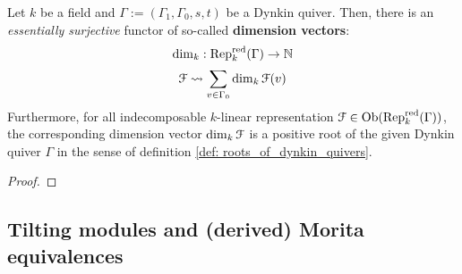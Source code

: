            \begin{corollary} \label{coro: dimension_vectors_of_indecomposable_representations_of_dynkin_quivers}
                Let $k$ be a field and $\Gamma := (\Gamma_1, \Gamma_0, s, t)$ be a Dynkin quiver. Then, there is an \textit{essentially surjective} functor of so-called \textbf{dimension vectors}:
                    $$\dim_k: \mathrm{Rep}_k^{\mathrm{red}}(\Gamma) \to \mathbb{N}$$
                    $$\mathcal{F} \leadsto \sum_{v \in \Gamma_0} \dim_k \mathcal{F}(v)$$
                Furthermore, for all indecomposable $k$-linear representation $\mathcal{F} \in \mathrm{Ob}(\mathrm{Rep}_k^{\mathrm{red}}(\Gamma))$, the corresponding dimension vector $\dim_k \mathcal{F}$ is a positive root of the given Dynkin quiver $\Gamma$ in the sense of definition \ref{def: roots_of_dynkin_quivers}.
            \end{corollary}
                \begin{proof}
                    
                \end{proof}
                
            \begin{example}
                
            \end{example}
            \begin{example}
                
            \end{example}
            \begin{example}
                
            \end{example}
            \begin{example}
                
            \end{example}
            \begin{example}
                
            \end{example}
        
    \subsection{Tilting modules and (derived) Morita equivalences}
